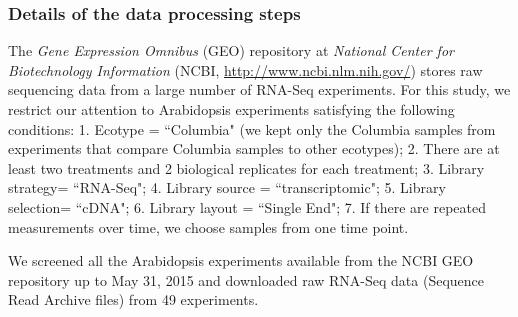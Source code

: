 	
	\subsubsection*{Details of the data processing steps}
	The \textit{Gene Expression Omnibus} (GEO) repository at \textit{National
		Center for Biotechnology Information} (NCBI,
	\url{http://www.ncbi.nlm.nih.gov/}) stores raw sequencing data from a large
	number of RNA-Seq experiments.  For this study, we restrict our attention to
	Arabidopsis experiments satisfying the following conditions: 1.  Ecotype =
	``Columbia" (we kept only the Columbia samples from experiments that compare
	Columbia samples to other ecotypes); 2. There are at least two treatments and 2 biological replicates for each
	treatment; 3. Library strategy= ``RNA-Seq"; 4.
	Library source = ``transcriptomic"; 5.  Library selection= ``cDNA"; 6.  Library
	layout = ``Single End"; 7. If there are repeated measurements over time, we choose samples from one time point. 
	
	We screened all the Arabidopsis experiments available from the NCBI
	GEO repository up to May 31, 2015 and downloaded raw RNA-Seq data (Sequence Read Archive files)
	from 49 experiments. %
	
